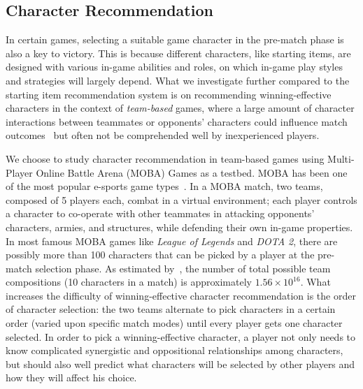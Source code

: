 \subsection{Character Recommendation}
In certain games, selecting a suitable game character in the pre-match phase is also a key to victory. This is because different characters, like starting items, are designed with various in-game abilities and roles, on which in-game play styles and strategies will largely depend. What we investigate further compared to the starting item recommendation system is on recommending winning-effective characters in the context of \textit{team-based} games, where a large amount of character interactions between teammates or opponents' characters could influence match outcomes~\cite{pobie1,Semenov2016,kim2016proficiency} but often not be comprehended well by inexperienced players.


We choose to study character recommendation in team-based games using Multi-Player Online Battle Arena (MOBA) Games as a testbed. MOBA has been one of the most popular e-sports game types~\cite{superdata2016}. In a MOBA match, two teams, composed of 5 players each, combat in a virtual environment; each player controls a character to co-operate with other teammates in attacking opponents' characters, armies, and structures, while defending their own in-game properties. In most famous MOBA games like \textit{League of Legends} and \textit{DOTA 2}, there are possibly more than 100 characters that can be picked by a player at the pre-match selection phase. As estimated by~\cite{hanke2017reco}, the number of total possible team compositions (10 characters in a match) is approximately $1.56 \times 10^{16}$. What increases the difficulty of winning-effective character recommendation is the order of character selection: the two teams alternate to pick characters in a certain order (varied upon specific match modes) until every player gets one character selected. In order to pick a winning-effective character, a player not only needs to know complicated synergistic and oppositional relationships among characters, but should also well predict what characters will be selected by other players and how they will affect his choice. 



